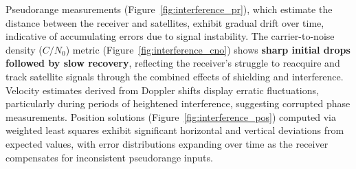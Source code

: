         Pseudorange measurements (Figure~\ref{fig:interference_pr}), which estimate the distance between the receiver and satellites, exhibit gradual drift over time, indicative of accumulating errors due to signal instability. The carrier-to-noise density ($C/N_0$) metric (Figure~\ref{fig:interference_cno}) shows \textbf{sharp initial drops followed by slow recovery}, reflecting the receiver's struggle to reacquire and track satellite signals through the combined effects of shielding and interference. Velocity estimates derived from Doppler shifts display erratic fluctuations, particularly during periods of heightened interference, suggesting corrupted phase measurements. Position solutions (Figure~\ref{fig:interference_pos}) computed via weighted least squares exhibit significant horizontal and vertical deviations from expected values, with error distributions expanding over time as the receiver compensates for inconsistent pseudorange inputs.
        
